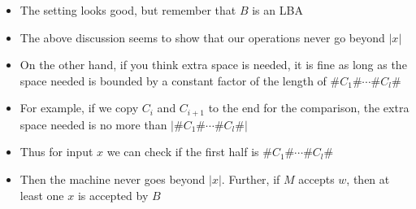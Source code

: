 \begin{frame}[allowframebreaks]
\begin{itemize}
\item The setting looks good, but
  remember that $B$ is an LBA
\item The above discussion seems to show that our operations
  never go beyond $|x|$
\item On the other hand, if you think extra space is needed, it is
  fine as long as the space needed is 
  bounded by a constant factor of the
  length of $\#C_1\# \cdots \# C_l\#$
\item For example, if we copy $C_i$ and $C_{i+1}$ to
  the end for the comparison, the extra space needed is no more than
  $|\#C_1\# \cdots \# C_l\#|$
\item Thus for input $x$ we can check if the first
  half is $\#C_1\# \cdots \# C_l\#$
\item Then the machine never goes beyond $|x|$.
Further, if $M$ accepts $w$,
  then at least one $x$ is accepted by $B$
\end{itemize}
\end{frame}

